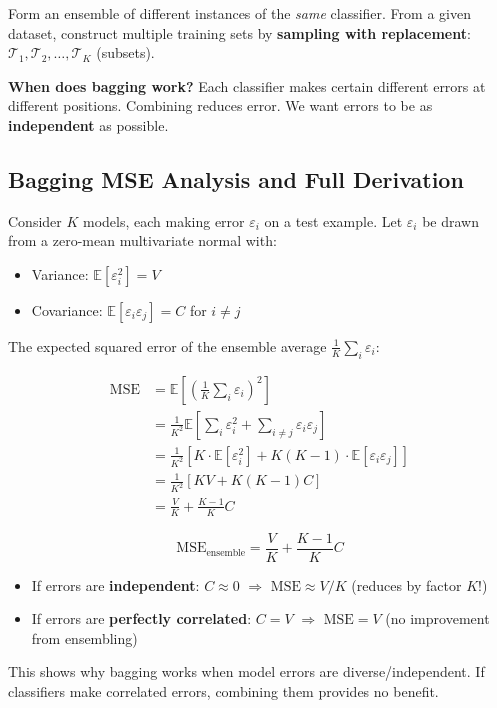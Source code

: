 \documentclass[12pt,a4paper]{article}
\newcommand{\E}{\mathbb{E}}
\begin{document}
Form an ensemble of different instances of the \emph{same} classifier. From a given dataset, construct multiple training sets by \textbf{sampling with replacement}: $\mathcal{T}_1, \mathcal{T}_2, \ldots, \mathcal{T}_K$ (subsets).

\textbf{When does bagging work?} Each classifier makes certain different errors at different positions. Combining reduces error. We want errors to be as \textbf{independent} as possible.

\subsection{Bagging MSE Analysis and Full Derivation}

Consider $K$ models, each making error $\varepsilon_i$ on a test example. Let $\varepsilon_i$ be drawn from a zero-mean multivariate normal with:
\begin{itemize}
  \item Variance: $\E[\varepsilon_i^2] = V$
  \item Covariance: $\E[\varepsilon_i\varepsilon_j] = C$ for $i \neq j$
\end{itemize}

The expected squared error of the ensemble average $\frac{1}{K}\sum_i\varepsilon_i$:

\begin{align*}
\text{MSE}
&= \E\!\left[\left(\frac{1}{K}\sum_i\varepsilon_i\right)^2\right]\\
&= \frac{1}{K^2}\E\!\left[\sum_i\varepsilon_i^2 + \sum_{i\neq j}\varepsilon_i\varepsilon_j\right]\\
&= \frac{1}{K^2}\left[K\cdot\E[\varepsilon_i^2] + K(K-1)\cdot\E[\varepsilon_i\varepsilon_j]\right]\\
&= \frac{1}{K^2}\left[KV + K(K-1)C\right]\\
&= \frac{V}{K} + \frac{K-1}{K}C
\end{align*}

\begin{thmbox}[title={Bagging MSE}]
\[
\text{MSE}_{\text{ensemble}} = \frac{V}{K} + \frac{K-1}{K}C
\]
\begin{itemize}
  \item If errors are \textbf{independent}: $C \approx 0$ $\Rightarrow$ $\text{MSE} \approx V/K$ (reduces by factor $K$!)
  \item If errors are \textbf{perfectly correlated}: $C = V$ $\Rightarrow$ $\text{MSE} = V$ (no improvement from ensembling)
\end{itemize}
This shows why bagging works when model errors are diverse/independent. If classifiers make correlated errors, combining them provides no benefit.
\end{thmbox}
\end{document}
